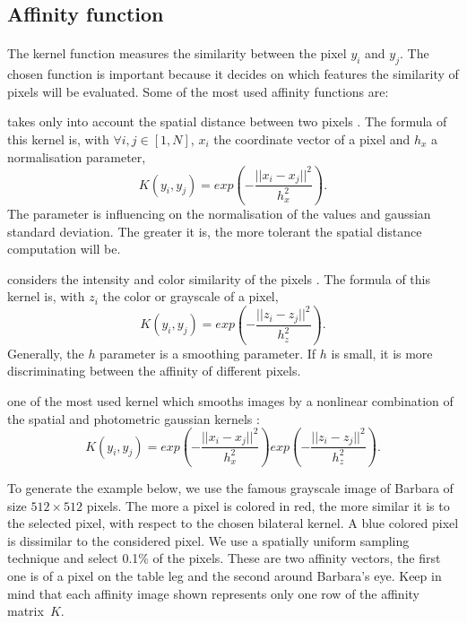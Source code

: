 \subsection{Affinity function}
\label{variations:affinity_functions}

\paragraph{}
The kernel function measures the similarity between the pixel \(y_i\) and \(y_j\).
The chosen function is important because it decides on which features the similarity of pixels will be evaluated.
Some of the most used affinity functions are:

\begin{description}[align=left]
 \item [Spatial Gaussian Kernel] takes only into account the spatial distance between two pixels \cite{siam_slides_2016}.
  The formula of this kernel is, with \(\forall i, j \in [1, N]\), \(x_i\) the coordinate vector of a pixel and \(h_x\) a normalisation parameter,
  \[K(y_i, y_j) = exp(-\frac{||x_i - x_j||^2}{h_x^2}).\]
  The parameter is influencing on the normalisation of the values and gaussian standard deviation.
  The greater it is, the more tolerant the spatial distance computation will be.

 \item [Photometric Gaussian Kernel] considers the intensity and color similarity of the pixels \cite{siam_slides_2016}.
  The formula of this kernel is, with \(z_i\) the color or grayscale of a pixel,
  \[K(y_i, y_j) = exp(-\frac{||z_i - z_j||^2}{h_z^2}).\]
  Generally, the \(h\) parameter is a smoothing parameter.
  If \(h\) is small, it is more discriminating between the affinity of different pixels.

 \item [Bilateral Kernel] one of the most used kernel which smooths images by a nonlinear combination of the spatial and photometric gaussian kernels \cite{siam_slides_2016} \cite{glide_2014} \cite{bilateral_tomasi_1998}:
  \[K(y_i, y_j) = exp(-\frac{||x_i - x_j||^2}{h_x^2}) exp(-\frac{||z_i - z_j||^2}{h_z^2}).\]

  To generate the example below, we use the famous grayscale image of Barbara of size \(512 \times 512\) pixels.
  The more a pixel is colored in red, the more similar it is to the selected pixel, with respect to the chosen bilateral kernel.
  A blue colored pixel is dissimilar to the considered pixel.
  We use a spatially uniform sampling technique and select 0.1\% of the pixels.
  These are two affinity vectors, the first one is of a pixel on the table leg and the second around Barbara's eye.
  Keep in mind that each affinity image shown represents only one row of the affinity matrix\ \(K\).


\end{description}
